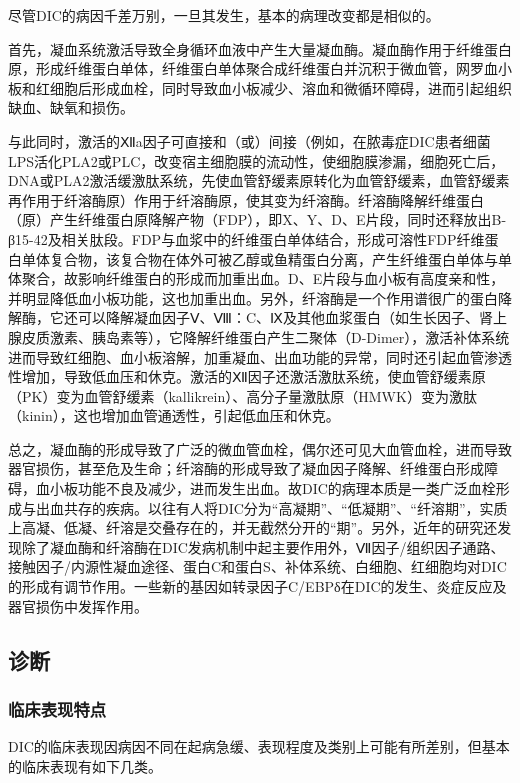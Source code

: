 尽管DIC的病因千差万别，一旦其发生，基本的病理改变都是相似的。

首先，凝血系统激活导致全身循环血液中产生大量凝血酶。凝血酶作用于纤维蛋白原，形成纤维蛋白单体，纤维蛋白单体聚合成纤维蛋白并沉积于微血管，网罗血小板和红细胞后形成血栓，同时导致血小板减少、溶血和微循环障碍，进而引起组织缺血、缺氧和损伤。

与此同时，激活的Ⅻa因子可直接和（或）间接（例如，在脓毒症DIC患者细菌LPS活化PLA2或PLC，改变宿主细胞膜的流动性，使细胞膜渗漏，细胞死亡后，DNA或PLA2激活缓激肽系统，先使血管舒缓素原转化为血管舒缓素，血管舒缓素再作用于纤溶酶原）作用于纤溶酶原，使其变为纤溶酶。纤溶酶降解纤维蛋白（原）产生纤维蛋白原降解产物（FDP），即X、Y、D、E片段，同时还释放出B-β15-42及相关肽段。FDP与血浆中的纤维蛋白单体结合，形成可溶性FDP纤维蛋白单体复合物，该复合物在体外可被乙醇或鱼精蛋白分离，产生纤维蛋白单体与单体聚合，故影响纤维蛋白的形成而加重出血。D、E片段与血小板有高度亲和性，并明显降低血小板功能，这也加重出血。另外，纤溶酶是一个作用谱很广的蛋白降解酶，它还可以降解凝血因子Ⅴ、Ⅷ：C、Ⅸ及其他血浆蛋白（如生长因子、肾上腺皮质激素、胰岛素等），它降解纤维蛋白产生二聚体（D-Dimer），激活补体系统进而导致红细胞、血小板溶解，加重凝血、出血功能的异常，同时还引起血管渗透性增加，导致低血压和休克。激活的Ⅻ因子还激活激肽系统，使血管舒缓素原（PK）变为血管舒缓素（kallikrein）、高分子量激肽原（HMWK）变为激肽（kinin），这也增加血管通透性，引起低血压和休克。

总之，凝血酶的形成导致了广泛的微血管血栓，偶尔还可见大血管血栓，进而导致器官损伤，甚至危及生命；纤溶酶的形成导致了凝血因子降解、纤维蛋白形成障碍，血小板功能不良及减少，进而发生出血。故DIC的病理本质是一类广泛血栓形成与出血共存的疾病。以往有人将DIC分为“高凝期”、“低凝期”、“纤溶期”，实质上高凝、低凝、纤溶是交叠存在的，并无截然分开的“期”。另外，近年的研究还发现除了凝血酶和纤溶酶在DIC发病机制中起主要作用外，Ⅶ因子/组织因子通路、接触因子/内源性凝血途径、蛋白C和蛋白S、补体系统、白细胞、红细胞均对DIC的形成有调节作用。一些新的基因如转录因子C/EBPδ在DIC的发生、炎症反应及器官损伤中发挥作用。

\subsection{诊断}

\subsubsection{临床表现特点}

DIC的临床表现因病因不同在起病急缓、表现程度及类别上可能有所差别，但基本的临床表现有如下几类。

